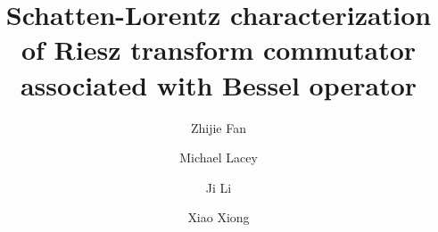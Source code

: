 \documentclass[12pt]{amsart}
\begin{document}
 \baselineskip 16.6pt
\hfuzz=6pt


\newtheorem{cl}{Claim}
\newtheorem{theorem}{Theorem}[section]
\newtheorem{proposition}[theorem]{Proposition}
\newtheorem{coro}[theorem]{Corollary}
\newtheorem{lemma}[theorem]{Lemma}
\newtheorem{definition}[theorem]{Definition}
\newtheorem{assum}{Assumption}[section]
\newtheorem{example}[theorem]{Example}
\newtheorem{remark}[theorem]{Remark}
\renewcommand{\theequation}
{\thesection.\arabic{equation}}

\def\SL{\sqrt H}

\newcommand{\mar}[1]{{\marginpar{\sffamily{\scriptsize
        #1}}}}

\newcommand{\as}[1]{{\mar{AS:#1}}}

\newcommand\R{\mathbb{R}}
\newcommand\RR{\mathbb{R}}
\newcommand\CC{\mathbb{C}}
\newcommand\NN{\mathbb{N}}
\newcommand\ZZ{\mathbb{Z}}
\newcommand\HH{\mathbb{H}}
\newcommand\Z{\mathbb{Z}}
\def\RN {\mathbb{R}^n}
\renewcommand\Re{\operatorname{Re}}
\renewcommand\Im{\operatorname{Im}}

\newcommand{\mc}{\mathcal}
\newcommand\D{\mathcal{D}}
\def\hs{\hspace{0.33cm}}
\newcommand{\la}{\alpha}
\def \l {\alpha}
\newcommand{\eps}{\tau}
\newcommand{\pl}{\partial}
\newcommand{\supp}{{\rm supp}{\hspace{.05cm}}}
\newcommand{\x}{\times}
\newcommand{\lag}{\langle}
\newcommand{\rag}{\rangle}

\newcommand\wrt{\,{\rm d}}

\newcommand{\norm}[2]{|#1|_{#2}}
\newcommand{\Norm}[2]{\|#1\|_{#2}}

\title[]{Schatten-Lorentz characterization of Riesz transform commutator associated with Bessel operator}



\author{Zhijie Fan}
\address{School of Mathematics and Information Science,
Guangzhou University, Guangzhou 510006, China}




%
\author{Michael Lacey}
\address{Michael Lacey, Department of Mathematics, Georgia Institute of Technology
Atlanta, GA 30332, USA}



\author{Ji Li}
\address{Ji Li, Department of Mathematics, Macquarie University, Sydney}

\author{Xiao Xiong}
\end{document}
